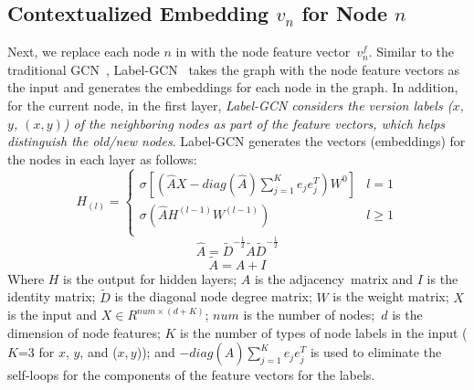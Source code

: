 
\subsection{Contextualized Embedding $v_n$ for Node $n$}
\label{label-gcn-compute}

Next, we replace each node $n$ in {\mvpdgxy} with the node feature
vector~$v^{f}_n$.
Similar to the traditional GCN~\cite{gcn}, Label-GCN~\cite{label-gcn}
takes the graph with the node feature vectors as the input and
generates the embeddings for each node in the graph. In addition, for
the current node, in the first layer, {\em Label-GCN considers the
  version labels ($x$,$y$, $(x,y)$) of the neighboring nodes as part of the
  feature vectors, which helps distinguish the old/new nodes}.
Label-GCN generates the vectors (embeddings) for the nodes in each
layer as follows:
\begin{equation}\label{eq1}
	H_{(l)} = 
	\begin{cases}
		\sigma [(\hat{A}X-diag(\hat{A})\sum_{j=1}^{K}e_je^T_j)W^0] &  l = 1\\
		\sigma (\hat{A}H^{(l-1)}W^{(l-1)}) &  l \geq 1\\
	\end{cases}
\end{equation}
\begin{equation}\label{eq2}
	\hat{A} = \tilde{D}^{-\frac{1}{2}}\tilde{A}\tilde{D}^{-\frac{1}{2}}
\end{equation}
\begin{equation}\label{eq3}
	\tilde{A} = A + I
\end{equation}
Where $H$ is the output for hidden layers; $A$ is the
adjacency~matrix and $I$ is the identity matrix; $\tilde{D}$ is the diagonal node degree matrix; $W$
is the weight matrix; $X$ is the input and $X \in R^{num \times (d+K)}$;
$num$ is the number of nodes;~$d$ is the dimension of node features;
$K$ is the number of types of node labels in the input ($K$=3 for $x$,
$y$, and ($x,y$)); and $-diag(\hat{A})\sum_{j=1}^{K}e_je^T_j$ is used
to eliminate the self-loops for the components of the feature vectors
for the labels.

